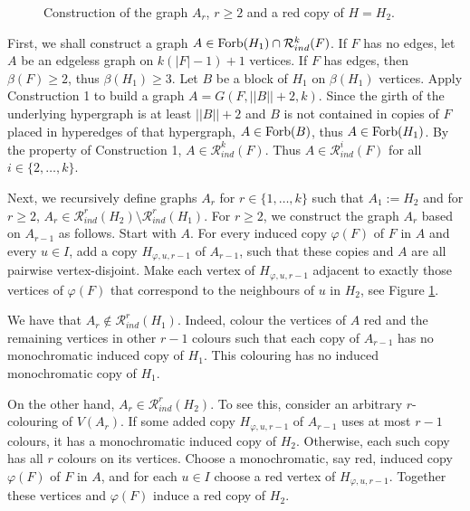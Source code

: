 \documentclass[10pt,a4paper]{article}
\theoremstyle{plain}
\theoremstyle{definition}
\newcommand{\R}{\mathcal{R}}
\newcommand{\Forb}{{\rm Forb}}
\newcommand{\Rk}{\R_{ind}}
\begin{document}
\begin{figure}
\begin{center}
{}
\end{center}
\caption{Construction of the graph $A_r$, $r\geq 2$ and a red copy of $H=H_2$.}
\label{figure}
\end{figure}

 
 First, we shall construct a graph $A\in \Forb(H_1)\cap \Rk^k(F)$.
 If $F$ has no edges, let $A$ be an edgeless graph on $k(|F|-1)+1$ vertices.
 If $F$ has edges, then $\beta(F)\geq 2$, thus $\beta(H_1)\geq 3$. Let $B$ be a block of $H_1$ on $\beta(H_1)$ vertices.
 Apply Construction 1 to build a graph $A=G(F, ||B||+2, k)$.
Since the girth of the underlying hypergraph is at least $||B||+2$ and $B$ is not contained in copies of $F$ placed in hyperedges of that hypergraph,  $A\in \Forb(B)$, thus $A\in \Forb(H_1)$.   By the property of Construction 1, $A\in \Rk^k(F)$. Thus $A\in \Rk^i(F)$ for all $i\in \{2,\dots,k\}$.

Next,  we recursively define graphs  $A_r$ for $r\in \{1,\dots, k\}$ such that $A_1:=H_2$ and for $r\geq 2$, $A_{r}\in \R_{ind}^{r}(H_2) \setminus \R_{ind}^{r}(H_1)$.
For $r\geq 2$,  we construct the graph $A_r$ based on $A_{r-1}$ as follows. Start with $A$. For every induced copy $\varphi(F)$ of
$F$ in $A$ and every $u\in I$, add a  copy $H_{\varphi,u, r-1}$ of $A_{r-1}$, such that these copies and $A$ are all pairwise vertex-disjoint. 
Make each vertex of $H_{\varphi,u,r-1 }$ adjacent to exactly those vertices of  $\varphi(F)$ that  correspond to the neighbours of $u$ in $H_2$, see Figure \ref{figure}.

We have that $A_r\not\in\Rk^r(H_1)$. Indeed, colour the vertices of $A$ red and the remaining vertices in other $r-1$ colours such that each copy of $A_{r-1}$ has no monochromatic induced copy of $H_1$. This colouring has no induced monochromatic copy of $H_1$.

On the other hand, $A_r\in \Rk^r(H_2)$.  To see this, consider an arbitrary  $r$-colouring of $V(A_r)$.  If some  added copy $H_{\varphi, u, r-1}$ of $A_{r-1}$ uses  at most  $r-1$ colours, it has a monochromatic induced copy of $H_2$. Otherwise, each such copy has all $r$ colours on its vertices.  Choose a monochromatic, say red,  induced  copy $\varphi(F)$ of $F$  in $A$,  and for each $u\in I$ choose a red
vertex of $H_{\varphi,u, r-1}$. Together these vertices and $\varphi(F)$ induce a red copy of $H_2$.
\end{document}
